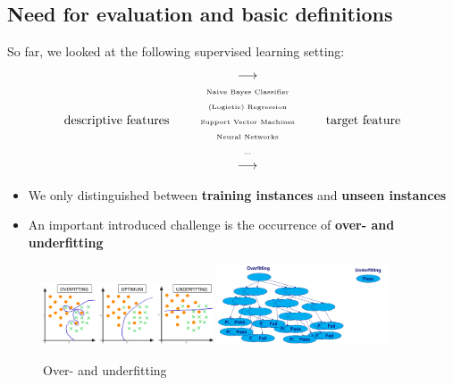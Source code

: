 \subsection{Need for evaluation and basic definitions}

So far, we looked at the following supervised learning setting:
\begin{align*}
  \begin{array}{ccc}
    & \longrightarrow\\
    \text{descriptive features}& \quad
    \begin{array}{c}
      \text{\tiny Naive Bayes Classifier}\\
      \text{\tiny (Logistic) Regression}\\
      \text{\tiny Support Vector Machines}\\
      \text{\tiny Neural Networks}\\
      \text{\tiny ...}\\
    \end{array}\quad&\text{target feature}\\
    &\longrightarrow
  \end{array}
\end{align*}
\begin{itemize}
  \item We only distinguished between \textbf{training instances} and \textbf{unseen instances}
  \item An important introduced challenge is the occurrence of \textbf{over- and underfitting}
\end{itemize}

\begin{figure}[H]
  \centering
  \includegraphics[width=0.45\textwidth]{assets/sl/basic__over_under_principle.png}
  \hspace*{0.05\textwidth}
  \includegraphics[width=0.45\textwidth]{assets/sl/basic__over_under_dt.png}

  \caption{Over- and underfitting}
  \label{fig:7_over_under_fitting}
\end{figure}

